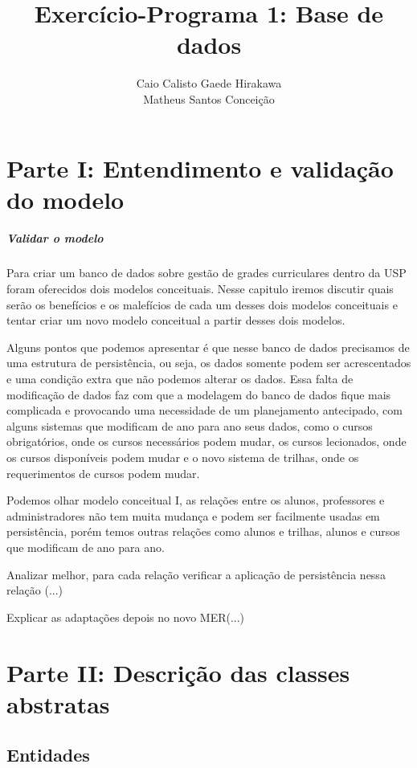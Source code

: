 \documentclass{report}
\author{Caio Calisto Gaede Hirakawa \\ Matheus Santos Conceição}
\title{Exercício-Programa 1: Base de dados}
\begin{document}
\maketitle
\tableofcontents
\chapter{Parte I: Entendimento e validação do modelo}
\paragraph{Validar o modelo}

Para criar um banco de dados sobre gestão de grades curriculares dentro da USP foram oferecidos dois modelos conceituais. Nesse capitulo iremos discutir quais serão os benefícios e os malefícios de cada um desses dois modelos conceituais e tentar criar um novo modelo conceitual a partir desses dois modelos.

Alguns pontos que podemos apresentar é que nesse banco de dados precisamos de uma estrutura de persistência, ou seja, os dados somente podem ser acrescentados e uma condição extra que não podemos alterar os dados. Essa falta de modificação de dados faz com que a modelagem do banco de dados fique mais complicada e provocando uma necessidade de um planejamento antecipado, com alguns sistemas que modificam de ano para ano seus dados, como o cursos obrigatórios, onde os cursos necessários podem mudar, os cursos lecionados, onde os cursos disponíveis podem mudar e o novo sistema de trilhas, onde os requerimentos de cursos podem mudar.

Podemos olhar modelo conceitual I, as relações entre os alunos, professores e administradores não tem muita mudança e podem ser facilmente usadas em persistência, porém temos outras relações como alunos e trilhas, alunos e cursos que modificam de ano para ano.

Analizar melhor, para cada relação verificar a aplicação de persistência nessa relação (...)


Explicar as adaptações depois no novo MER(...)


\chapter{Parte II: Descrição das classes abstratas}

\section{Entidades}
\end{document}
